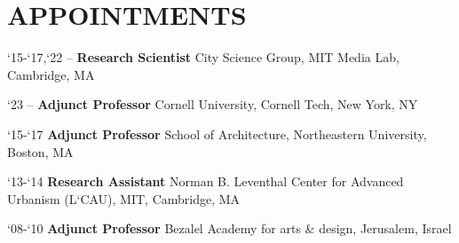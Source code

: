 \section*{APPOINTMENTS}

\begin{tablist}

    \item[`15-`17,`22 --]\tab\textbf{Research Scientist}
    City Science Group, MIT Media Lab, Cambridge, MA

    \item[`23 --]\tab\textbf{Adjunct Professor}
    Cornell University, Cornell Tech, New York, NY

    \item[`15-`17]\tab\textbf{Adjunct Professor}
    School of Architecture, Northeastern University, Boston, MA

    \item[`13-`14]\tab\textbf{Research Assistant}
    Norman B. Leventhal Center for Advanced Urbanism (L`CAU), MIT, Cambridge, MA


    \item[`08-`10]\tab\textbf{Adjunct Professor}
    Bezalel Academy for arts \& design, Jerusalem, Israel


\end{tablist}
